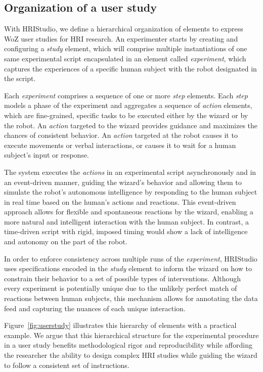\documentclass[letterpaper, 10 pt, conference]{ieeeconf}
\begin{document}
\subsection{Organization of a user study}

With HRIStudio, we define a hierarchical organization of elements to express WoZ user studies for HRI research. An experimenter starts by creating and configuring a \emph{study} element, which will comprise multiple instantiations of one same experimental script encapsulated in an element called \emph{experiment}, which captures the experiences of a specific human subject with the robot designated in the script. 

Each \emph{experiment} comprises a sequence of one or more \emph{step} elements. Each \emph{step} models a phase of the experiment and aggregates a sequence of \emph{action} elements, which are fine-grained, specific tasks to be executed either by the wizard or by the robot. An \emph{action} targeted to the wizard provides guidance and maximizes the chances of consistent behavior. An \emph{action} targeted at the robot causes it to execute movements or verbal interactions, or causes it to wait for a human subject's input or response.

The system executes the \emph{actions} in an experimental script asynchronously and in an event-driven manner, guiding the wizard's behavior and allowing them to simulate the robot's autonomous intelligence by responding to the human subject in real time based on the human's actions and reactions. This event-driven approach allows for flexible and spontaneous reactions by the wizard, enabling a more natural and intelligent interaction with the human subject. In contrast, a time-driven script with rigid, imposed timing would show a lack of intelligence and autonomy on the part of the robot.

In order to enforce consistency across multiple runs of the \emph{experiment}, HRIStudio uses specifications encoded in the \emph{study} element to inform the wizard on how to constrain their behavior to a set of possible types of interventions. Although every experiment is potentially unique due to the unlikely perfect match of reactions between human subjects, this mechanism allows for annotating the data feed and capturing the nuances of each unique interaction.

Figure~\ref{fig:userstudy} illustrates this hierarchy of elements with a practical example.  We argue that this hierarchical structure for the experimental procedure in a user study benefits methodological rigor and reproducibility while affording the researcher the ability to design complex HRI studies while guiding the wizard to follow a consistent set of instructions.
\end{document}
